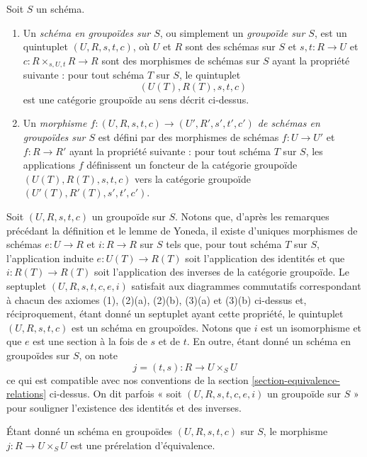 \begin{definition}
\label{definition-groupoid}
Soit $S$ un schéma.
\begin{enumerate}
\item Un {\it schéma en groupoïdes sur $S$}, ou simplement un
{\it groupoïde sur $S$}, est un
quintuplet $(U, R, s, t, c)$, où
$U$ et $R$ sont des schémas sur $S$ et
$s, t : R \to U$ et $c : R \times_{s, U, t} R \to R$
sont des morphismes de schémas sur $S$ ayant la
propriété suivante : pour tout schéma
$T$ sur $S$, le quintuplet
$$
(U(T), R(T), s, t, c)
$$
est une catégorie groupoïde au sens décrit ci-dessus.
\item Un {\it morphisme
$f : (U, R, s, t, c) \to (U', R', s', t', c')$
de schémas en groupoïdes sur $S$} est défini par des morphismes
de schémas $f : U \to U'$ et $f : R \to R'$ ayant la
propriété suivante : pour tout schéma
$T$ sur $S$, les applications $f$ définissent un foncteur de la
catégorie groupoïde $(U(T), R(T), s, t, c)$ vers la
catégorie groupoïde $(U'(T), R'(T), s', t', c')$.
\end{enumerate}
\end{definition}

\noindent
Soit $(U, R, s, t, c)$ un groupoïde sur $S$.
Notons que, d'après les remarques précédant la définition et le lemme de Yoneda,
il existe d'uniques morphismes de schémas
$e : U \to R$ et
$i : R \to R$ sur $S$ tels que, pour tout schéma $T$ sur $S$,
l'application induite $e : U(T) \to R(T)$ soit l'application des identités et que
$i : R(T) \to R(T)$ soit l'application des inverses de
la catégorie groupoïde. Le septuplet $(U, R, s, t, c, e, i)$
satisfait aux diagrammes commutatifs correspondant à chacun des
axiomes (1), (2)(a), (2)(b), (3)(a) et (3)(b) ci-dessus et, réciproquement,
étant donné un septuplet ayant cette propriété, le quintuplet $(U, R, s, t, c)$
est un schéma en groupoïdes. Notons que $i$ est un isomorphisme
et que $e$ est une section à la fois de $s$ et de $t$.
En outre, étant donné un schéma en groupoïdes sur $S$, on note
$$
j = (t, s) : R \longrightarrow U \times_S U
$$
ce qui est compatible avec nos conventions de la section
\ref{section-equivalence-relations} ci-dessus.
On dit parfois « soit $(U, R, s, t, c, e, i)$ un
groupoïde sur $S$ » pour souligner l'existence des identités et des
inverses.

\begin{lemma}
\label{lemma-groupoid-pre-equivalence}
Étant donné un schéma en groupoïdes $(U, R, s, t, c)$ sur $S$,
le morphisme $j : R \to U \times_S U$ est une prérelation
d'équivalence.
\end{lemma}

